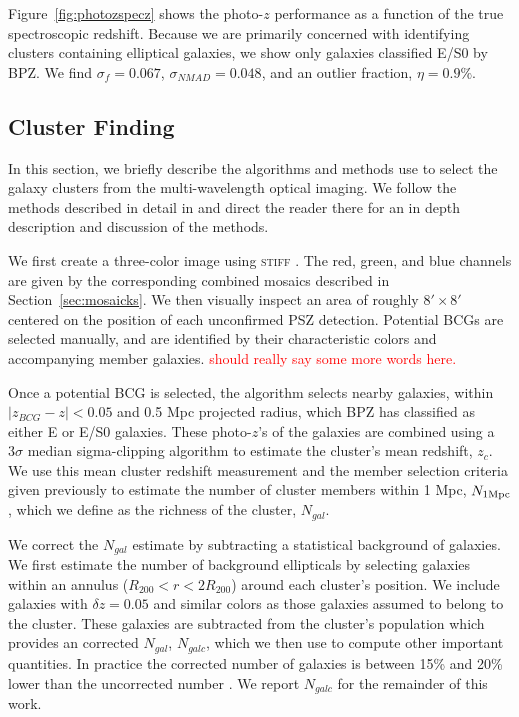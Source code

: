 \documentclass[apj, revtex4-1]{emulateapj}
\newcommand{\editorial}[1]{\textcolor{red}{#1}}
\begin{document}
Figure~\ref{fig:photozspecz} shows the photo-$z$ performance as a function of the true spectroscopic redshift. Because we are primarily concerned with identifying clusters containing elliptical galaxies, we show only galaxies classified E/S0 by BPZ. We find $\sigma_f = 0.067$, $\sigma_{NMAD} = 0.048$, and an outlier fraction, $\eta = 0.9\%$.

\subsection{Cluster Finding}
In this section, we briefly describe the algorithms and methods use to select the galaxy clusters from the multi-wavelength optical imaging. We follow the methods described in detail in \cite{Menanteau2009a, Menanteau2010} and direct the reader there for an in depth description and discussion of the methods.

We first create a three-color image using \textsc{stiff} \citep{Bertin2011}. The red, green, and blue channels are given by the corresponding combined mosaics described in Section~\ref{sec:mosaicks}. We then visually inspect an area of roughly $8' \times 8'$ centered on the position of each unconfirmed PSZ detection. Potential BCGs are selected manually, and are identified by their characteristic colors and accompanying member galaxies. \editorial{should really say some more words here.}

Once a potential BCG is selected, the algorithm selects nearby galaxies, within $|z_{BCG} - z| < 0.05$ and 0.5 Mpc projected radius, which BPZ has classified as either E or E/S0 galaxies. These photo-$z$'s of the galaxies are combined using a $3\sigma$ median sigma-clipping algorithm to estimate the cluster's mean redshift, $z_c$. We use this mean cluster redshift measurement and the member selection criteria given previously to estimate the number of cluster members within 1 Mpc, $N_{1\rm Mpc}$, which we define as the richness of the cluster, $N_{gal}$.

We correct the $N_{gal}$ estimate by subtracting a statistical background of galaxies. We first estimate the number of background ellipticals by selecting galaxies within an annulus ($R_{200} <r < 2R_{200}$) around each cluster's position. We include galaxies with $\delta z = 0.05$ and similar colors as those galaxies assumed to belong to the cluster. These galaxies are subtracted from the cluster's population which provides an corrected $N_{gal}$, $N_{galc}$, which we then use to compute other important quantities. In practice the corrected number of galaxies is between 15\% and 20\% lower than the uncorrected number \citep{Menanteau2010}. We report $N_{galc}$ for the remainder of this work.
\end{document}
